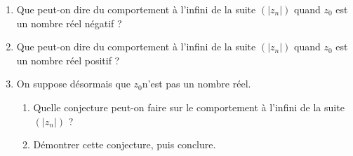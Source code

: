 \documentclass{cornouaille}
\begin{document}
\begin{exercice}
\begin{enumerate}
\item Que peut-on dire du comportement à l'infini de la suite $\left(\left|z_n\right|\right)$ quand $z_0$ est un nombre réel négatif ?
\item Que peut-on dire du comportement à l'infini de la suite $\left(\left|z_n\right|\right)$ quand $z_0$ est un nombre réel positif ?
\item On suppose désormais que $z_0 $n'est pas un nombre réel.
	\begin{enumerate}
		\item Quelle conjecture peut-on faire sur le comportement à l'infini de la suite $\left(\left|z_n\right|\right)$ ?
		\item Démontrer cette conjecture, puis conclure.
	\end{enumerate} 
\end{enumerate}
\end{exercice}
\end{document}

